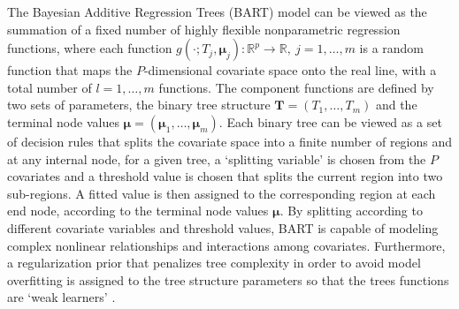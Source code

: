 \documentclass[preprint,12pt,authoryear]{elsarticle}
\begin{document}
{
The Bayesian Additive Regression Trees (BART) model \citep{chipman2010bart} can be viewed as the summation of a fixed number of highly flexible nonparametric regression functions, where each function {$g(\cdot ; T_j, \boldsymbol{\mu}_j): \mathbb{R}^p \rightarrow \mathbb{R}, ~ j = 1, \dots, m$} is a random function that maps the $P$-dimensional covariate space onto the real line, with a total number of $l = 1, \dots, m$ functions. The component functions are defined by two sets of parameters, the binary tree structure $\mathbf{T}=\left(T_1, \ldots, T_m\right)$ and the terminal node values $\boldsymbol{\mu} = (\boldsymbol{\mu}_1, \ldots, \boldsymbol{\mu}_m)$. Each binary tree can be viewed as a set of decision rules that splits the covariate space into a finite number of regions and at any internal node, for a given tree, a `splitting variable' is chosen from the $P$ covariates and a threshold value is chosen that splits the current region into two sub-regions. A fitted value is then assigned to the corresponding region at each end node, according to the terminal node values $\boldsymbol{\mu}$. By splitting according to different covariate variables and threshold values, BART is capable of modeling complex nonlinear relationships and interactions among covariates. Furthermore, a regularization prior that penalizes tree complexity in order to avoid model overfitting is assigned to the tree structure parameters so that the trees functions are `weak learners' \citep{chipman2010bart}. 

}
\end{document}
